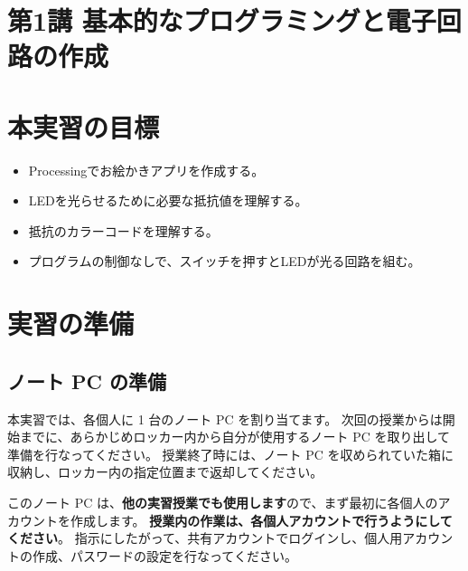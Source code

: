 \documentclass[11pt,a4paper]{jarticle}
\begin{document}
\section*{\LARGE{第1講 基本的なプログラミングと電子回路の作成}}

\section{本実習の目標}
\begin{itemize}
 \item Processingでお絵かきアプリを作成する。
 \item LEDを光らせるために必要な抵抗値を理解する。
 \item 抵抗のカラーコードを理解する。
 \item プログラムの制御なしで、スイッチを押すとLEDが光る回路を組む。
\end{itemize}

\section{実習の準備}
\subsection*{ノート PC の準備}
本実習では、各個人に 1 台のノート PC を割り当てます。
次回の授業からは開始までに、あらかじめロッカー内から自分が使用するノート PC を取り出して準備を行なってください。
授業終了時には、ノート PC を収められていた箱に収納し、ロッカー内の指定位置まで返却してください。

このノート PC は、\textbf{他の実習授業でも使用します}ので、まず最初に各個人のアカウントを作成します。
\textbf{授業内の作業は、各個人アカウントで行うようにしてください}。
指示にしたがって、共有アカウントでログインし、個人用アカウントの作成、パスワードの設定を行なってください。
\end{document}
